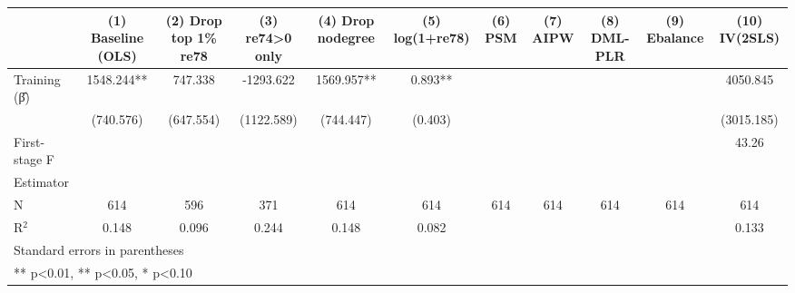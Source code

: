 \begin{table}[htbp]
\centering
\begin{tabular}{lcccccccccc}
\hline\hline
 & (1) Baseline (OLS) & (2) Drop top 1\% re78 & (3) re74>0 only & (4) Drop nodegree & (5) log(1+re78) & (6) PSM & (7) AIPW & (8) DML-PLR & (9) Ebalance & (10) IV(2SLS) \\
\hline
Training (β̂) & 1548.244** & 747.338 & -1293.622 & 1569.957** & 0.893** &  &  &  &  & 4050.845 \\
 & (740.576) & (647.554) & (1122.589) & (744.447) & (0.403) &  &  &  &  & (3015.185) \\
\hline
First-stage F &  &  &  &  &  &  &  &  &  & 43.26 \\
\hline
Estimator &  &  &  &  &  &  &  &  &  &  \\
N & 614 & 596 & 371 & 614 & 614 & 614 & 614 & 614 & 614 & 614 \\
R$^2$ & 0.148 & 0.096 & 0.244 & 0.148 & 0.082 &  &  &  &  & 0.133 \\
\hline\hline
\multicolumn{11}{l}{\footnotesize Standard errors in parentheses} \\
\multicolumn{11}{l}{\footnotesize *** p<0.01, ** p<0.05, * p<0.10} \\
\end{tabular}
\end{table}